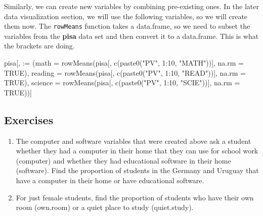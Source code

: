 \documentclass[
]{book}
\newenvironment{Shaded}{\begin{snugshade}}{\end{snugshade}}
\newcommand{\AttributeTok}[1]{\textcolor[rgb]{0.77,0.63,0.00}{#1}}
\newcommand{\ConstantTok}[1]{\textcolor[rgb]{0.00,0.00,0.00}{#1}}
\newcommand{\DecValTok}[1]{\textcolor[rgb]{0.00,0.00,0.81}{#1}}
\newcommand{\FunctionTok}[1]{\textcolor[rgb]{0.00,0.00,0.00}{#1}}
\newcommand{\NormalTok}[1]{#1}
\newcommand{\SpecialCharTok}[1]{\textcolor[rgb]{0.00,0.00,0.00}{#1}}
\newcommand{\StringTok}[1]{\textcolor[rgb]{0.31,0.60,0.02}{#1}}
\begin{document}
Similarly, we can create new variables by combining pre-existing ones. In the later data visualization section, we will use the following variables, so we will create them now. The \texttt{rowMeans} function takes a data.frame, so we need to subset the variables from the \textbf{pisa} data set and then convert it to a data.frame. This is what the brackets are doing.

\begin{Shaded}
\begin{Highlighting}[]
\NormalTok{pisa[, }\StringTok{\textasciigrave{}}\AttributeTok{:=}\StringTok{\textasciigrave{}}
\NormalTok{     (}\AttributeTok{math =} \FunctionTok{rowMeans}\NormalTok{(pisa[, }\FunctionTok{c}\NormalTok{(}\FunctionTok{paste0}\NormalTok{(}\StringTok{"PV"}\NormalTok{, }\DecValTok{1}\SpecialCharTok{:}\DecValTok{10}\NormalTok{, }\StringTok{"MATH"}\NormalTok{))], }\AttributeTok{na.rm =} \ConstantTok{TRUE}\NormalTok{),}
       \AttributeTok{reading =} \FunctionTok{rowMeans}\NormalTok{(pisa[, }\FunctionTok{c}\NormalTok{(}\FunctionTok{paste0}\NormalTok{(}\StringTok{"PV"}\NormalTok{, }\DecValTok{1}\SpecialCharTok{:}\DecValTok{10}\NormalTok{, }\StringTok{"READ"}\NormalTok{))], }\AttributeTok{na.rm =} \ConstantTok{TRUE}\NormalTok{),}
       \AttributeTok{science =} \FunctionTok{rowMeans}\NormalTok{(pisa[, }\FunctionTok{c}\NormalTok{(}\FunctionTok{paste0}\NormalTok{(}\StringTok{"PV"}\NormalTok{, }\DecValTok{1}\SpecialCharTok{:}\DecValTok{10}\NormalTok{, }\StringTok{"SCIE"}\NormalTok{))], }\AttributeTok{na.rm =} \ConstantTok{TRUE}\NormalTok{))]}
\end{Highlighting}
\end{Shaded}

\hypertarget{exercises-2}{%
\subsection{Exercises}\label{exercises-2}}

\begin{enumerate}
\def\labelenumi{\arabic{enumi}.}
\item
  The computer and software variables that were created above ask a student whether they had a computer in their home that they can use for school work (computer) and whether they had educational software in their home (software). Find the proportion of students in the Germany and Uruguay that have a computer in their home or have educational software.
\item
  For just female students, find the proportion of students who have their own room (own.room) or a quiet place to study (quiet.study).
\end{enumerate}
\end{document}
